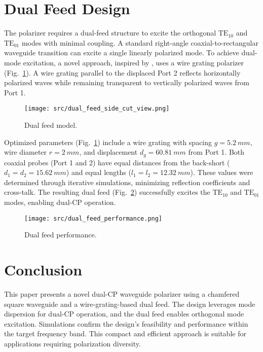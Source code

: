 \documentclass[conference,a4paper]{isap2025}
\begin{document}
\section{Dual Feed Design}
The polarizer requires a dual-feed structure to excite the orthogonal $\text{TE}_{10}$ and $\text{TE}_{01}$ modes with minimal coupling.  A standard right-angle coaxial-to-rectangular waveguide transition \cite{fabregas-et-al:coaxial-to-rectangular-waveguide-transitions} can excite a single linearly polarized mode. To achieve dual-mode excitation, a novel approach, inspired by \cite{karki-et-al:dual-polarized-probe-for-planar-near-field-measurement}, uses a wire grating polarizer (Fig.~\ref{fig:dual-feed-model}). A wire grating parallel to the displaced Port 2 reflects horizontally polarized waves while remaining transparent to vertically polarized waves from Port 1.

\begin{figure}[hbt]
    \centering
    \texttt{[image: src/dual\_feed\_side\_cut\_view.png]}
    \caption{Dual feed model.}
    \label{fig:dual-feed-model}
\end{figure}

Optimized parameters (Fig.~\ref{fig:dual-feed-model}) include a wire grating with spacing $g = \qty{5.2}{mm}$, wire diameter $r = \qty{2}{mm}$, and displacement $d_g = \qty{60.81}{mm}$ from Port 1.  Both coaxial probes (Port 1 and 2) have equal distances from the back-short ($d_1=d_2 = \qty{15.62}{mm}$) and equal lengths ($l_1=l_2=\qty{12.32}{mm}$). These values were determined through iterative simulations, minimizing reflection coefficients and cross-talk. The resulting dual feed (Fig.~\ref{fig:dual-feed-performance}) successfully excites the $\text{TE}_{10}$ and $\text{TE}_{01}$ modes, enabling dual-CP operation.

\begin{figure}[hbt]
    \centering
    \texttt{[image: src/dual\_feed\_performance.png]}
    \caption{Dual feed performance.}
    \label{fig:dual-feed-performance}
\end{figure}


\section{Conclusion}
This paper presents a novel dual-CP waveguide polarizer using a chamfered square waveguide and a wire-grating-based dual feed. The design leverages mode dispersion for dual-CP operation, and the dual feed enables orthogonal mode excitation. Simulations confirm the design's feasibility and performance within the target frequency band.  This compact and efficient approach is suitable for applications requiring polarization diversity.
\end{document}
